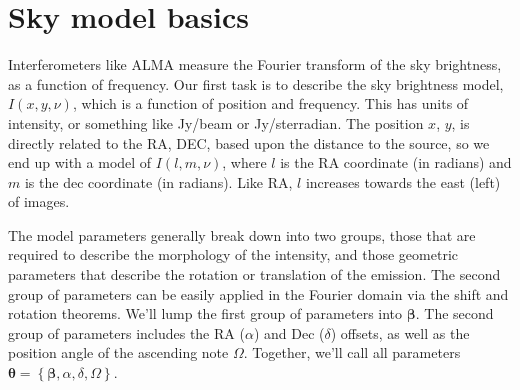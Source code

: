 \documentclass[modern]{aastex62}
\newcommand{\bbeta}{\boldsymbol{\beta}} %
\newcommand{\btheta}{\boldsymbol{\theta}} %
\begin{document}

\section{Sky model basics}
Interferometers like ALMA measure the Fourier transform of the sky brightness, as a function of frequency. Our first task is to describe the sky brightness model, $I(x, y, \nu)$, which is a function of position and frequency. This has units of intensity, or something like Jy/beam or Jy/sterradian. The position $x$, $y$, is directly related to the RA, DEC, based upon the distance to the source, so we end up with a model of $I(l, m, \nu)$, where $l$ is the RA coordinate (in radians) and $m$ is the dec coordinate (in radians). Like RA, $l$ increases towards the east (left) of images.

The model parameters generally break down into two groups, those that are required to describe the morphology of the intensity, and those geometric parameters that describe the rotation or translation of the emission. The second group of parameters can be easily applied in the Fourier domain via the shift and rotation theorems. We'll lump the first group of parameters into $\bbeta$. The second group of parameters includes the RA ($\alpha$) and Dec ($\delta$) offsets, as well as the position angle of the ascending note $\Omega$. Together, we'll call all parameters $\btheta = \left \{ \bbeta, \alpha, \delta, \Omega \right \}$.
\end{document}
